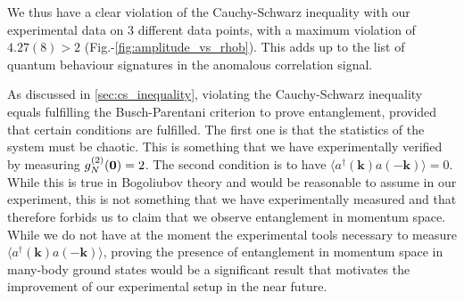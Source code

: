 We thus have a clear violation of the Cauchy-Schwarz inequality with our experimental data on 3 different data points, with a maximum violation of $4.27(8) > 2$ (Fig.-\ref{fig:amplitude_vs_rhob}). This adds up to the list of quantum behaviour signatures in the anomalous correlation signal.

As discussed in \ref{sec:cs_inequality}, violating the Cauchy-Schwarz inequality equals fulfilling the Busch-Parentani criterion to prove entanglement, provided that certain conditions are fulfilled. The first one is that the statistics of the system must be chaotic. This is something that we have experimentally verified by measuring $g^{(2)}_N (\bm{0}) = 2$. The second condition is to have $\langle a^{\dagger}({\bm k}) a({-\bm k}) \rangle=0$. While this is true in Bogoliubov theory and would be reasonable to assume in our experiment, this is not something that we have experimentally measured and that therefore forbids us to claim that we observe entanglement in momentum space. While we do not have at the moment the experimental tools necessary to measure $\langle a^{\dagger}({\bm k}) a({-\bm k}) \rangle$, proving the presence of entanglement in momentum space in many-body ground states would be a significant result that motivates the improvement of our experimental setup in the near future.








